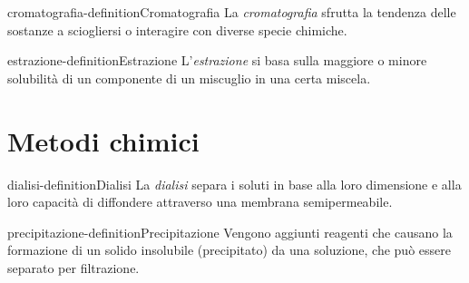 \documentclass[preview]{standalone}
\begin{document}
\begin{snippetdefinition}{cromatografia-definition}{Cromatografia}
    La \textit{cromatografia} sfrutta la tendenza delle sostanze a sciogliersi o interagire
    con diverse specie chimiche.
\end{snippetdefinition}

\begin{snippetdefinition}{estrazione-definition}{Estrazione}
    L'\textit{estrazione} si basa sulla maggiore o minore solubilità di un componente di un miscuglio in una certa miscela.
\end{snippetdefinition}

\section{Metodi chimici}


\begin{snippetdefinition}{dialisi-definition}{Dialisi}
    La \textit{dialisi} separa i soluti in base alla loro dimensione e alla loro capacità di diffondere attraverso una
    membrana semipermeabile.
\end{snippetdefinition}

\begin{snippetdefinition}{precipitazione-definition}{Precipitazione}
    Vengono aggiunti reagenti che causano la formazione di un solido insolubile (precipitato)
    da una soluzione, che può essere separato per filtrazione.
\end{snippetdefinition}
\end{document}
